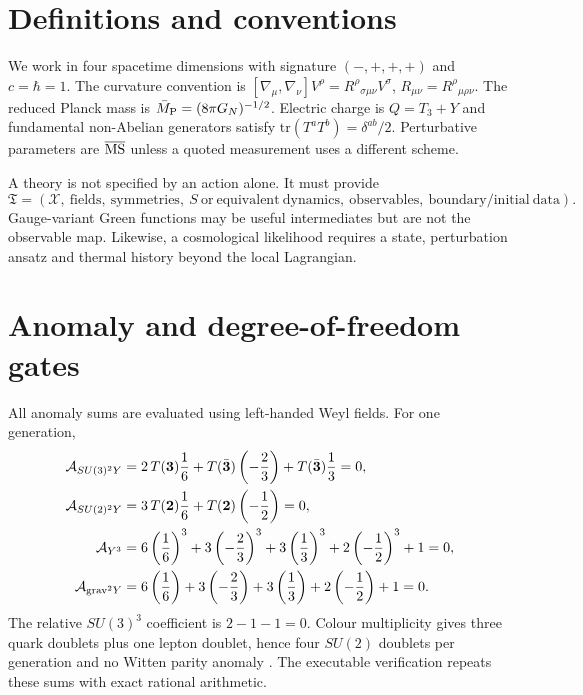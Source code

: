 \documentclass[11pt,a4paper]{article}
\newcommand{\Mpl}{\bar M_{\rm P}}
\begin{document}
\section{Definitions and conventions}
We work in four spacetime dimensions with signature $(-,+,+,+)$ and $c=\hbar=1$. The curvature convention is $[\nabla_\mu,\nabla_\nu]V^\rho=R^\rho{}_{\sigma\mu\nu}V^\sigma$, $R_{\mu\nu}=R^\rho{}_{\mu\rho\nu}$. The reduced Planck mass is $\Mpl=(8\pi G_N)^{-1/2}$. Electric charge is $Q=T_3+Y$ and fundamental non-Abelian generators satisfy $\mathrm{tr}(T^aT^b)=\delta^{ab}/2$. Perturbative parameters are $\overline{\rm MS}$ unless a quoted measurement uses a different scheme.

A theory is not specified by an action alone. It must provide
\begin{equation}
\mathfrak T=(\mathcal X,\ \mathrm{fields},\ \mathrm{symmetries},\ S\ \mathrm{or\ equivalent\ dynamics},\ \mathrm{observables},\ \mathrm{boundary/initial\ data}).
\end{equation}
Gauge-variant Green functions may be useful intermediates but are not the observable map. Likewise, a cosmological likelihood requires a state, perturbation ansatz and thermal history beyond the local Lagrangian.



\section{Anomaly and degree-of-freedom gates}
All anomaly sums are evaluated using left-handed Weyl fields. For one generation,
\begin{align}
\mathcal A_{SU(3)^2Y}&=2\,T(\mathbf3)\frac16+T(\bar{\mathbf3})\left(-\frac23\right)+T(\bar{\mathbf3})\frac13=0,\\
\mathcal A_{SU(2)^2Y}&=3\,T(\mathbf2)\frac16+T(\mathbf2)\left(-\frac12\right)=0,\\
\mathcal A_{Y^3}&=6\left(\frac16\right)^3+3\left(-\frac23\right)^3+3\left(\frac13\right)^3+2\left(-\frac12\right)^3+1=0,\\
\mathcal A_{{\rm grav}^2Y}&=6\left(\frac16\right)+3\left(-\frac23\right)+3\left(\frac13\right)+2\left(-\frac12\right)+1=0.
\end{align}
The relative $SU(3)^3$ coefficient is $2-1-1=0$. Colour multiplicity gives three quark doublets plus one lepton doublet, hence four $SU(2)$ doublets per generation and no Witten parity anomaly \cite{Witten1982}. The executable verification repeats these sums with exact rational arithmetic.
\end{document}
